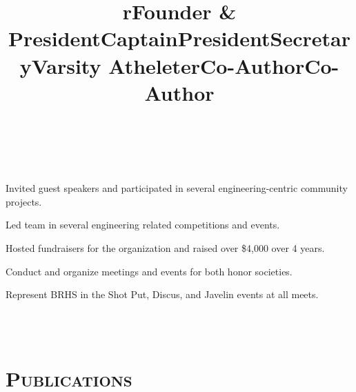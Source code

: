 \begin{resume}
\begin{formatb}
  \title{r}\\
  \body\\
\end{formatb}

\title{Founder \& President}
\begin{position}
Invited guest speakers and participated in several engineering-centric community projects.
\end{position}

\title{Captain}
\begin{position}
Led team in several engineering related competitions and events.
\end{position}

\title{President}
\begin{position}
Hosted fundraisers for the organization and raised over \$4,000 over 4 years.
\end{position}

\title{Secretary}
\begin{position}
Conduct and organize meetings and events for both honor societies.
\end{position}

\title{Varsity Athelete}
\begin{position}
Represent BRHS in the Shot Put, Discus, and Javelin events at all meets.
\end{position}

\newpage

\begin{formatb}
  \title{r}\\
  \\
\end{formatb}

\section{\textsc{Publications}}

\title{Co-Author}
\begin{position}
\end{position}

\title{Co-Author}
\begin{position}
\end{position}


\end{resume}
